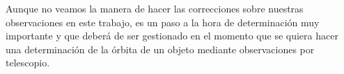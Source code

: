 Aunque no veamos la manera de hacer las correcciones sobre nuestras observaciones en este trabajo, es un paso a la hora de determinación muy importante y que deberá de ser gestionado en el momento que se quiera hacer una determinación de la órbita de un objeto mediante observaciones por telescopio.\\

